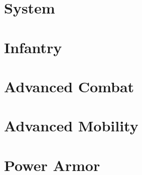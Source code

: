 \documentclass{article}
\begin{document}
\newpage

\section{System}



\newpage

\section{Infantry}



\newpage

\section{Advanced Combat}



\newpage

\section{Advanced Mobility}



\newpage

\section{Power Armor}



\newpage
\end{document}
